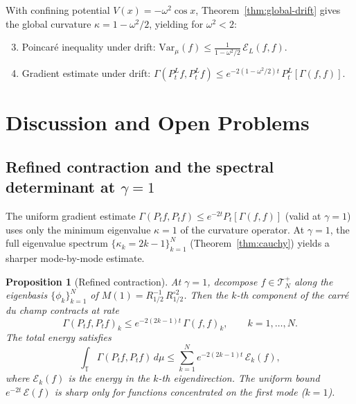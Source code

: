 \documentclass[11pt,a4paper]{article}
\theoremstyle{plain}
\newtheorem{proposition}[theorem]{Proposition}
\theoremstyle{definition}
\theoremstyle{remark}
\newcommand{\T}{\mathbb{T}}
\newcommand{\Var}{\mathrm{Var}}
\begin{document}
With confining potential $V(x) = -\omega^2\cos x$,
Theorem~\ref{thm:global-drift} gives the global curvature
$\kappa = 1 - \omega^2/2$, yielding for $\omega^2 < 2$:
\begin{enumerate}[label=(\roman*)]
\setcounter{enumi}{2}
\item Poincar\'e inequality under drift:
  $\Var_\mu(f) \leq \frac{1}{1-\omega^2/2}\,\mathcal{E}_L(f,f)$.
\item Gradient estimate under drift:
  $\Gamma(P_t^L f, P_t^L f) \leq
  e^{-2(1-\omega^2/2)t}\,P_t^L[\Gamma(f,f)]$.
\end{enumerate}


\section{Discussion and Open Problems}\label{sec:discussion}

\subsection{Refined contraction and the spectral determinant at $\gamma = 1$}

The uniform gradient estimate
$\Gamma(P_t f, P_t f) \leq e^{-2t}P_t[\Gamma(f,f)]$
(valid at $\gamma = 1$) uses only
the minimum eigenvalue $\kappa = 1$ of the curvature operator.
At $\gamma = 1$, the full eigenvalue spectrum
$\{\kappa_k = 2k-1\}_{k=1}^N$ (Theorem~\ref{thm:cauchy})
yields a sharper mode-by-mode estimate.

\begin{proposition}[Refined contraction]\label{prop:refined}
At $\gamma = 1$, decompose $f \in \mathcal{T}_N^+$ along the
eigenbasis $\{\phi_k\}_{k=1}^N$ of $M(1) = R_{1/2}^{-1}\,R_{1/2}^{\circ 2}$.
Then the $k$-th component of the carr\'e du champ contracts at rate
\begin{equation}\label{eq:refined-contraction}
  \Gamma(P_t f, P_t f)_k \leq e^{-2(2k-1)t}\,\Gamma(f,f)_k,
  \qquad k = 1,\ldots,N.
\end{equation}
The total energy satisfies
\begin{equation}\label{eq:total-energy}
  \int_\T \Gamma(P_t f, P_t f)\,d\mu
  \leq \sum_{k=1}^N e^{-2(2k-1)t}\,\mathcal{E}_k(f),
\end{equation}
where $\mathcal{E}_k(f)$ is the energy in the $k$-th eigendirection.
The uniform bound $e^{-2t}\,\mathcal{E}(f)$ is sharp only for
functions concentrated on the first mode ($k=1$).
\end{proposition}
\end{document}
